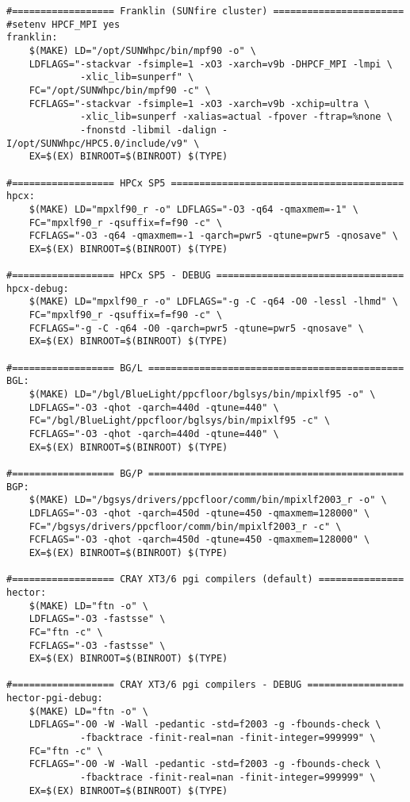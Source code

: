 \begin{verbatim}
#================== Franklin (SUNfire cluster) =======================
#setenv HPCF_MPI yes
franklin:
	$(MAKE) LD="/opt/SUNWhpc/bin/mpf90 -o" \
	LDFLAGS="-stackvar -fsimple=1 -xO3 -xarch=v9b -DHPCF_MPI -lmpi \
	         -xlic_lib=sunperf" \
	FC="/opt/SUNWhpc/bin/mpf90 -c" \
	FCFLAGS="-stackvar -fsimple=1 -xO3 -xarch=v9b -xchip=ultra \
	         -xlic_lib=sunperf -xalias=actual -fpover -ftrap=%none \
	         -fnonstd -libmil -dalign -I/opt/SUNWhpc/HPC5.0/include/v9" \
	EX=$(EX) BINROOT=$(BINROOT) $(TYPE)

#================== HPCx SP5 =========================================
hpcx:
	$(MAKE) LD="mpxlf90_r -o" LDFLAGS="-O3 -q64 -qmaxmem=-1" \
	FC="mpxlf90_r -qsuffix=f=f90 -c" \
	FCFLAGS="-O3 -q64 -qmaxmem=-1 -qarch=pwr5 -qtune=pwr5 -qnosave" \
	EX=$(EX) BINROOT=$(BINROOT) $(TYPE)

#================== HPCx SP5 - DEBUG =================================
hpcx-debug:
	$(MAKE) LD="mpxlf90_r -o" LDFLAGS="-g -C -q64 -O0 -lessl -lhmd" \
	FC="mpxlf90_r -qsuffix=f=f90 -c" \
	FCFLAGS="-g -C -q64 -O0 -qarch=pwr5 -qtune=pwr5 -qnosave" \
	EX=$(EX) BINROOT=$(BINROOT) $(TYPE)

#================== BG/L =============================================
BGL:
	$(MAKE) LD="/bgl/BlueLight/ppcfloor/bglsys/bin/mpixlf95 -o" \
	LDFLAGS="-O3 -qhot -qarch=440d -qtune=440" \
	FC="/bgl/BlueLight/ppcfloor/bglsys/bin/mpixlf95 -c" \
	FCFLAGS="-O3 -qhot -qarch=440d -qtune=440" \
	EX=$(EX) BINROOT=$(BINROOT) $(TYPE)

#================== BG/P =============================================
BGP:
	$(MAKE) LD="/bgsys/drivers/ppcfloor/comm/bin/mpixlf2003_r -o" \
	LDFLAGS="-O3 -qhot -qarch=450d -qtune=450 -qmaxmem=128000" \
	FC="/bgsys/drivers/ppcfloor/comm/bin/mpixlf2003_r -c" \
	FCFLAGS="-O3 -qhot -qarch=450d -qtune=450 -qmaxmem=128000" \
	EX=$(EX) BINROOT=$(BINROOT) $(TYPE)

#================== CRAY XT3/6 pgi compilers (default) ===============
hector:
	$(MAKE) LD="ftn -o" \
	LDFLAGS="-O3 -fastsse" \
	FC="ftn -c" \
	FCFLAGS="-O3 -fastsse" \
	EX=$(EX) BINROOT=$(BINROOT) $(TYPE)

#================== CRAY XT3/6 pgi compilers - DEBUG =================
hector-pgi-debug:
	$(MAKE) LD="ftn -o" \
	LDFLAGS="-O0 -W -Wall -pedantic -std=f2003 -g -fbounds-check \
	         -fbacktrace -finit-real=nan -finit-integer=999999" \
	FC="ftn -c" \
	FCFLAGS="-O0 -W -Wall -pedantic -std=f2003 -g -fbounds-check \
	         -fbacktrace -finit-real=nan -finit-integer=999999" \
	EX=$(EX) BINROOT=$(BINROOT) $(TYPE)


\end{verbatim}
